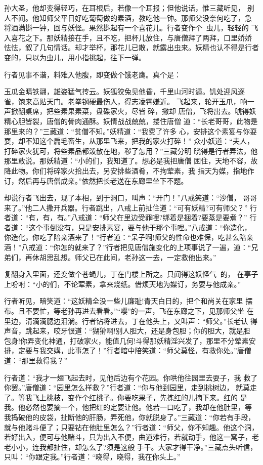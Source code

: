 孙大圣，他却变得轻巧，在耳根后，若像一个耳报；但他说话，惟三藏听见，
别人不闻。他知师父平日好吃葡萄做的素酒，教吃他一钟。那师父没奈何吃了，急
将酒满斟一钟，回与妖怪。果然斟起有一个喜花儿。行者变作个虫儿，轻轻的
飞入喜花之下。那妖精接在手，且不吃，把杯儿放住，与唐僧拜了两拜，口里娇娇
怯怯，叙了几句情话。却才举杯，那花儿已散，就露出虫来。妖精也认不得是行者
变的，只以为虫儿，用小指挑起，往下一弹。

行者见事不谐，料难入他腹，即变做个饿老鹰。真个是：

玉瓜金睛铁翮，雄姿猛气抟云。妖狐狡兔见他昏，千里山河时遁。饥处迎风逐
雀，饱来高贴天门。老拳钢硬最伤人，得志凌霄嫌近。
飞起来，轮开玉爪，响一声掀翻桌席，把些素果素菜，盘碟家火，尽皆碎，撇却
唐僧，飞将出去。唬得妖精心胆皆裂，唐僧的骨肉通酥。妖情战战兢兢，搂住唐僧
道：“长老哥哥，此物是那里来的？”三藏道：“贫僧不知。”妖精道：“我费了许多
心，安排这个素宴与你耍耍，却不知这个扁毛畜生，从那里飞来，把我的家火打碎！”
众小妖道：“夫人，打碎家火犹可，将些素品都泼散在地，秽了怎用？”三藏分明
晓得是行者弄法，他那里敢说。那妖精道：“小的们，我知道了。想必是我把唐僧
困住，天地不容，故降此物。你们将碎家火拾出去，另安排些酒肴，不拘荤素，我
指天为媒，指地作订，然后再与唐僧成亲。”依然把长老送在东廊里坐下不题。

却说行者飞出去，现了本相，到于洞口，叫声：“开门！”八戒笑道：“沙僧，
哥哥来了。”他二人撒开兵器。行者跳出，八戒上前扯住道：“可有妖精?可有师父？”
行者道：“有，有，有。”八戒道：“师父在里边受罪哩?绑着是捆着?要蒸是要煮？”
行者道：“这个事倒没有，只是安排素宴，要与他干那个事哩。”八戒道：“你造化，
你造化，你吃了陪亲酒来了！”行者道：“呆子啊!师父的性命也难保，吃甚么陪亲
酒！”八戒道：“你怎的就来了？”行者把见唐僧施变化的上项事说了一遍，道：“兄
弟们，再休胡思乱想。师父已在此间，老孙这一去，一定救他出来。”

复翻身入里面，还变做个苍蝇儿，丁在门楼上所之。只闻得这妖怪气的，
在亭子上吩咐：“小的们，不论荤素，拿来烧纸。借烦天地为媒订，务要与他成亲。”

行者听见，暗笑道：“这妖精全没一些儿廉耻!青天白日的，把个和尚关在家里
摆布。且不要忙，等老孙再进去看看。”“嘤”的一声，飞在东廊之下，见那师父坐
在里边，清滴滴腮边泪淌。行者钻将进去，丁在他头上，又叫声：“师父。”长老认
得声音，跳起来，咬牙恨道：“猢狲啊!别人胆大，还是身包胆；你的胆大，就是胆
包身!你弄变化神通，打破家火，能值几何!斗得那妖精淫兴发了，那里不分荤素安
排，定要与我交媾，此事怎了！”行者暗中陪笑道：“师父莫怪，有救你处。”唐僧
道：“那里救得我？”

行者道：“我才一翅飞起去时，见他后边有个花园。你哄他往园里去耍子，我
救了你罢。”唐僧道：“园里怎么样救？”行者道：“你与他到园里，走到桃树边，
就莫走了。等我飞上桃枝，变作个红桃子。你要吃果子，先拣红的儿摘下来。红的
是我。他必然也要摘一个，他把红的定要让他。他若一口吃了，我却在他肚里，等
我捣破他的皮袋，扯断他的肝肠，弄死他，你就脱身了。”三藏道：“你若有手段，
就与他赌斗便了；只要钻在他肚里怎么？”行者道：“师父，你不知趣。他这个洞，
若好出入，便可与他赌斗，只为出入不便，曲道难行，若就动手，他这一窝子，老
老小小，连我都扯住，却怎么了?须是这般手干。大家才得干净。”三藏点头听信，
只叫：“你跟定我。”行者道：“晓得，晓得，我在你头上。”

